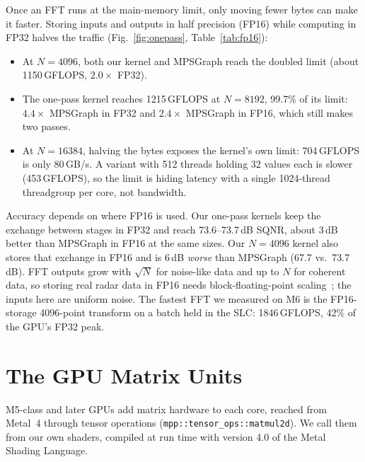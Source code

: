 \documentclass[conference]{IEEEtran}
\newcommand{\GF}{\,GFLOPS}
\begin{document}
Once an FFT runs at the main-memory limit, only moving fewer bytes can make it faster. Storing inputs
and outputs in half precision (FP16) while computing in FP32 halves the traffic (Fig.~\ref{fig:onepass},
Table~\ref{tab:fp16}):
\begin{itemize}
\item At $N=4096$, both our kernel and MPSGraph reach the doubled limit (about 1150\GF{}, $2.0\times$
  FP32).
\item The one-pass kernel reaches 1215\GF{} at $N=8192$, 99.7\% of its limit: $4.4\times$ MPSGraph
  in FP32 and $2.4\times$ MPSGraph in FP16, which still makes two passes.
\item At $N=16384$, halving the bytes exposes the kernel's own limit: 704\GF{} is only 80\,GB/s. A
  variant with 512 threads holding 32 values each is slower (453\GF{}), so the limit is hiding latency
  with a single 1024-thread threadgroup per core, not bandwidth.
\end{itemize}

Accuracy depends on where FP16 is used. Our one-pass kernels keep the exchange between stages in FP32
and reach 73.6--73.7\,dB SQNR, about 3\,dB better than MPSGraph in FP16 at the same sizes. Our
$N=4096$ kernel also stores that exchange in FP16 and is 6\,dB \emph{worse} than MPSGraph (67.7 vs.\
73.7\,dB). FFT outputs grow with $\sqrt N$ for noise-like data and up to $N$ for coherent data, so
storing real radar data in FP16 needs block-floating-point scaling~\cite{bergach2026fp16}; the inputs
here are uniform noise. The fastest FFT we measured on M6 is the FP16-storage 4096-point transform on a
batch held in the SLC: 1846\GF{}, 42\% of the GPU's FP32 peak.

\section{The GPU Matrix Units}\label{sec:mma}

M5-class and later GPUs add matrix hardware to each core, reached from Metal~4 through tensor
operations (\texttt{mpp::\allowbreak tensor\_ops::\allowbreak matmul2d}). We call them from our own
shaders, compiled at run time with version 4.0 of the Metal Shading Language.
\end{document}

